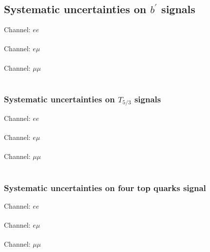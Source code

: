 

\subsection{Systematic uncertainties on $b^\prime$ signals}
\label{App:SameSignSystematics}



\begin{centering}
\tiny
Channel: $ee$ \\

\\
Channel: $e \mu$ \\

\\
Channel: $\mu \mu$ \\

\\
\label{tab:systematicsBprime}
\end{centering}


\subsubsection{Systematic uncertainties on $T_{5/3}$ signals}
\begin{centering}
\tiny
Channel: $ee$ \\

\\
Channel: $e \mu$ \\

\\
Channel: $\mu \mu$ \\

\\
\label{tab:systematicsT53}
\end{centering}


\subsubsection{Systematic uncertainties on four top quarks signal}
\begin{centering}
\tiny
Channel: $ee$ \\

\\
Channel: $e \mu$ \\

\\
Channel: $\mu \mu$ \\

\\
\label{tab:systematics4t}
\end{centering}


